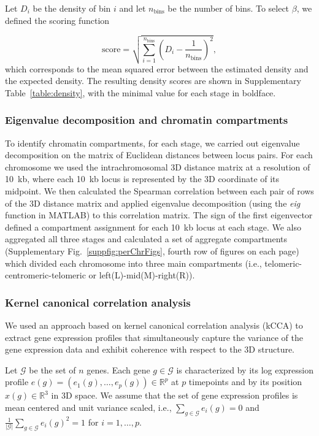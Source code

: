 Let $D_i$ be the density of bin $i$ and let $n_{\text{bins}}$ be the
number of bins. To select $\beta$, we defined the scoring function

\begin{equation}
\text{score} = \sqrt{\sum_{i = 1}^{n_\text{bins}} \left(D_i -
\frac{1}{n_\text{bins}}\right)^2},
\end{equation}
which corresponds to the mean squared error between the estimated density and
the expected density. The resulting density scores are shown in Supplementary
Table~\ref*{table:density}, with the minimal value for each stage in boldface.

\subsubsection*{Eigenvalue decomposition and chromatin compartments}
\label{met:compartments}
To identify chromatin compartments, for each stage, we
carried out eigenvalue decomposition on the matrix of Euclidean
distances between locus pairs. For each chromosome we used the
intrachromosomal 3D distance matrix at a resolution of 10~kb, where
each 10~kb locus is represented by the 3D coordinate of its
midpoint. We then calculated the Spearman correlation between each
pair of rows of the 3D distance matrix and applied eigenvalue
decomposition (using the \emph{eig} function in MATLAB) to this
correlation matrix. The sign of the first eigenvector defined a
compartment assignment for each 10~kb locus at each stage. We also
aggregated all three stages and calculated a set of aggregate compartments
(Supplementary Fig.~\ref*{suppfig:perChrFigs}, fourth row of figures on each page)
which divided each chromosome into three main compartments (i.e.,
telomeric-centromeric-telomeric or left(L)-mid(M)-right(R)).

\subsubsection*{Kernel canonical correlation analysis}
\label{met:kCCA}

We used an approach based on kernel canonical correlation analysis (kCCA)
\citep{bach:kernel,vert:graph,vert:extracting} to extract gene expression profiles that
simultaneously capture the variance of the gene expression data and exhibit
coherence with respect to the 3D structure.

Let $\mathcal{G}$ be the set of $n$ genes. Each gene $g\in\mathcal{G}$ is
characterized by its log expression profile $e(g) = \left( e_1(g), \ldots,
e_p(g)\right) \in \mathbb{R}^p$ at $p$ timepoints
and by its position $x(g) \in \mathbb{R}^3$
in 3D
space. We assume that the set of gene expression profiles is mean centered and
unit variance scaled, i.e., $\sum_{g\in\mathcal{G}}e_i(g) = 0$ and
$\frac{1}{|\mathcal{G}|}\sum_{g\in\mathcal{G}} e_i(g)^2 = 1$ for
$i=1,\ldots,p$.

